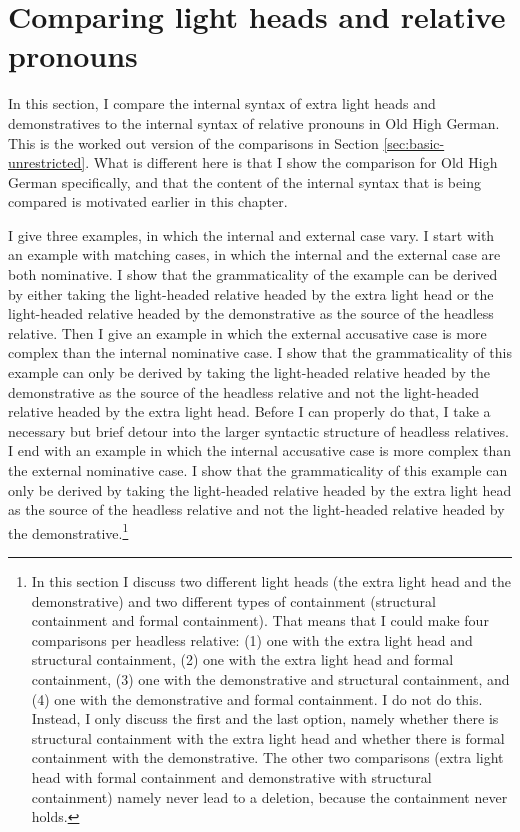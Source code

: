 \section{Comparing light heads and relative pronouns}\label{sec:comparing-ohg}

In this section, I compare the internal syntax of extra light heads and demonstratives to the internal syntax of relative pronouns in Old High German. This is the worked out version of the comparisons in Section \ref{sec:basic-unrestricted}. What is different here is that I show the comparison for Old High German specifically, and that the content of the internal syntax that is being compared is motivated earlier in this chapter.

I give three examples, in which the internal and external case vary.
I start with an example with matching cases, in which the internal and the external case are both nominative. I show that the grammaticality of the example can be derived by either taking the light-headed relative headed by the extra light head or the light-headed relative headed by the demonstrative as the source of the headless relative.
Then I give an example in which the external accusative case is more complex than the internal nominative case. I show that the grammaticality of this example can only be derived by taking the light-headed relative headed by the demonstrative as the source of the headless relative and not the light-headed relative headed by the extra light head. Before I can properly do that, I take a necessary but brief detour into the larger syntactic structure of headless relatives.
I end with an example in which the internal accusative case is more complex than the external nominative case. I show that the grammaticality of this example can only be derived by taking the light-headed relative headed by the extra light head as the source of the headless relative and not the light-headed relative headed by the demonstrative.\footnote{
In this section I discuss two different light heads (the extra light head and the demonstrative) and two different types of containment (structural containment and formal containment). That means that I could make four comparisons per headless relative: (1) one with the extra light head and structural containment, (2) one with the extra light head and formal containment, (3) one with the demonstrative and structural containment, and (4) one with the demonstrative and formal containment. I do not do this. Instead, I only discuss the first and the last option, namely whether there is structural containment with the extra light head and whether there is formal containment with the demonstrative. The other two comparisons (extra light head with formal containment and demonstrative with structural containment) namely never lead to a deletion, because the containment never holds.
}

